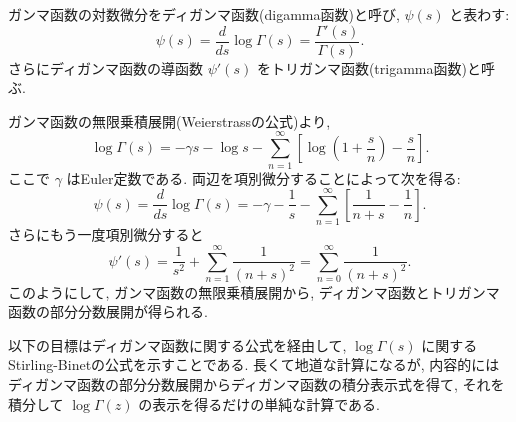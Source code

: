 \documentclass[12pt,twoside]{jarticle}
\theoremstyle{jplain}
\theoremstyle{jplain}
\theoremstyle{jplain}
\numberwithin{theorem}{section}
\numberwithin{equation}{section}
\numberwithin{figure}{section}
\numberwithin{table}{section}
\begin{document}
ガンマ函数の対数微分をディガンマ函数(digamma函数)と呼び, $\psi(s)$ と表わす:
\[
\psi(s)=\frac{d}{ds}\log\Gamma(s)=\frac{\Gamma'(s)}{\Gamma(s)}.
\]
さらにディガンマ函数の導函数 $\psi'(s)$ をトリガンマ函数(trigamma函数)と呼ぶ.

ガンマ函数の無限乗積展開(Weierstrassの公式)より,
\[
\log\Gamma(s)
=
-\gamma s - \log s
-\sum_{n=1}^\infty\left[\log\left(1+\frac{s}{n}\right)-\frac{s}{n}\right].
\]
ここで $\gamma$ はEuler定数である.
両辺を項別微分することによって次を得る:
\[
\psi(s)=\frac{d}{ds}\log\Gamma(s)
=
-\gamma - \frac{1}{s}
-\sum_{n=1}^\infty\left[\frac{1}{n+s}-\frac{1}{n} \right].
\]
さらにもう一度項別微分すると
\[
\psi'(s)
=\frac{1}{s^2}+\sum_{n=1}^\infty\frac{1}{(n+s)^2}
=\sum_{n=0}^\infty\frac{1}{(n+s)^2}.
\]
このようにして, ガンマ函数の無限乗積展開から,
ディガンマ函数とトリガンマ函数の部分分数展開が得られる.

以下の目標はディガンマ函数に関する公式を経由して,
$\log\Gamma(s)$ に関するStirling-Binetの公式を示すことである.
長くて地道な計算になるが, 内容的には
ディガンマ函数の部分分数展開からディガンマ函数の積分表示式を得て,
それを積分して $\log\Gamma(z)$ の表示を得るだけの単純な計算である.
\end{document}
